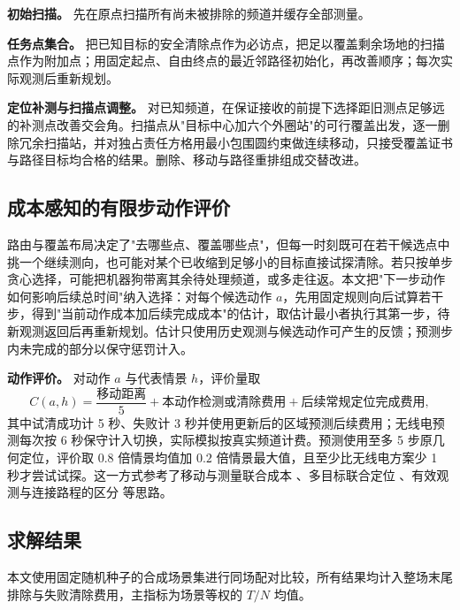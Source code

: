 \documentclass[UTF8,a4paper,zihao=-4,fontset=none]{ctexart}
\begin{document}
\textbf{初始扫描。} 先在原点扫描所有尚未被排除的频道并缓存全部测量。

\textbf{任务点集合。} 把已知目标的安全清除点作为必访点，把足以覆盖剩余场地的扫描点作为附加点；用固定起点、自由终点的最近邻路径初始化，再改善顺序；每次实际观测后重新规划。

\textbf{定位补测与扫描点调整。} 对已知频道，在保证接收的前提下选择距旧测点足够远的补测点改善交会角。扫描点从"目标中心加六个外圈站"的可行覆盖出发，逐一删除冗余扫描站，并对独占责任方格用最小包围圆约束做连续移动，只接受覆盖证书与路径目标均合格的结果。删除、移动与路径重排组成交替改进。

\subsection{成本感知的有限步动作评价}

路由与覆盖布局决定了"去哪些点、覆盖哪些点"，但每一时刻既可在若干候选点中挑一个继续测向，也可能对某个已收缩到足够小的目标直接试探清除。若只按单步贪心选择，可能把机器狗带离其余待处理频道，或多走往返。本文把"下一步动作如何影响后续总时间"纳入选择：对每个候选动作 $a$，先用固定规则向后试算若干步，得到"当前动作成本加后续完成成本"的估计，取估计最小者执行其第一步，待新观测返回后再重新规划。估计只使用历史观测与候选动作可产生的反馈；预测步内未完成的部分以保守惩罚计入。

\textbf{动作评价。} 对动作 $a$ 与代表情景 $h$，评价量取
\begin{equation}
  C(a,h)=\frac{\text{移动距离}}{5}+\text{本动作检测或清除费用}+\text{后续常规定位完成费用},
  \label{eq:q3-action}
\end{equation}
其中试清成功计 5 秒、失败计 3 秒并使用更新后的区域预测后续费用；无线电预测每次按 6 秒保守计入切换，实际模拟按真实频道计费。预测使用至多 5 步原几何定位，评价取 $0.8$ 倍情景均值加 $0.2$ 倍情景最大值，且至少比无线电方案少 1 秒才尝试试探。这一方式参考了移动与测量联合成本 \cite{VanderHook2014}、多目标联合定位 \cite{Engin2020}、有效观测与连接路程的区分 \cite{Song2012} 等思路。

\subsection{求解结果}

本文使用固定随机种子的合成场景集进行同场配对比较，所有结果均计入整场末尾排除与失败清除费用，主指标为场景等权的 $T/N$ 均值。
\end{document}
